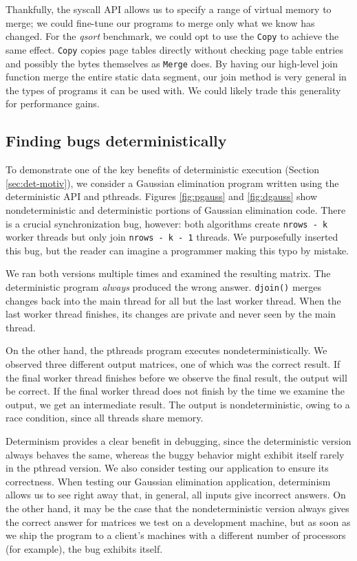 Thankfully, the syscall API allows us to specify a range of virtual memory to
merge; we could fine-tune our programs to merge only what we know has changed.
For the \emph{qsort} benchmark, we could opt to use the {\tt Copy} to achieve
the same effect. {\tt Copy} copies page tables directly without checking page
table entries and possibly the bytes themselves as {\tt Merge} does. By having
our high-level join function merge the entire static data segment, our join
method is very general in the types of programs it can be used with. We could
likely trade this generality for performance gains.

\subsection{Finding bugs deterministically}

To demonstrate one of the key benefits of deterministic execution (Section
\ref{sec:det-motiv}), we consider a Gaussian elimination program written using
the deterministic API and pthreads. Figures \ref{fig:pgauss} and
\ref{fig:dgauss} show nondeterministic and deterministic portions of Gaussian
elimination code. There is a crucial synchronization bug, however: both
algorithms create \mbox{\tt nrows - k} worker threads but only join
\mbox{\tt nrows - k - 1} threads. We purposefully inserted this bug, but the
reader can imagine a programmer making this typo by mistake.

We ran both versions multiple times and examined the resulting matrix.
The deterministic program \emph{always}
produced the wrong answer. {\tt djoin()} merges changes back into the main
thread for all but the last worker thread. When the last worker thread
finishes, its changes are private and never seen by the main thread.

On the other hand, the pthreads program executes nondeterministically. We
observed three different output matrices, one of which was the correct result.
If the final worker thread finishes before we observe the final result, the
output will be correct. If the final worker thread does not finish by the time
we examine the output, we get an intermediate result. The output is
nondeterministic, owing to a race condition, since all threads share memory.

Determinism provides a clear benefit in debugging, since the deterministic
version always behaves the same, whereas the buggy behavior might exhibit itself
rarely in the pthread version.
We also consider testing our application to ensure its correctness.
When testing our Gaussian elimination application, determinism allows us to see
right away that, in general, all inputs give incorrect answers. On the other
hand, it may be the case that the nondeterministic version always gives
the correct answer for matrices we test on a development machine, but as soon as
we ship the program to a client's machines with a different number of processors
(for example), the bug exhibits itself.



\endinput

